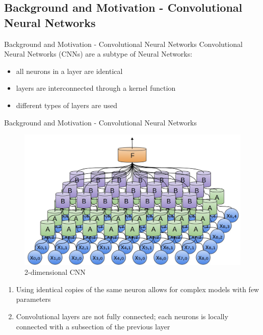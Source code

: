 \documentclass[12pt]{beamer}
\begin{document}
\subsection{Background and Motivation - Convolutional Neural Networks}
\begin{frame}{Background and Motivation - Convolutional Neural Networks}
Convolutional Neural Networks (CNNs) are a subtype of Neural Networks:
  \begin{itemize}
     \item all neurons in a layer are identical 
     \item layers are interconnected through a kernel function
     \item different types of layers are used %
  \end{itemize}
\end{frame}
\begin{frame}{Background and Motivation - Convolutional Neural Networks}
\begin{figure}
\centering
\includegraphics[width = 0.4\linewidth]{images/convexample.jpg}
\caption{2-dimensional CNN}
\label{fig:principle}
\end{figure}
\begin{enumerate}
\item Using identical copies of the same neuron allows for complex models with few parameters
\item Convolutional layers are not fully connected; each neurons is locally connected with a subsection of the previous layer
\end{enumerate}
\end{frame}
\end{document}
